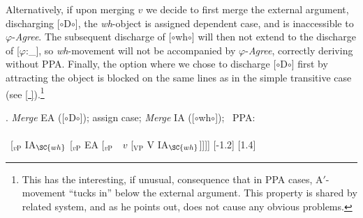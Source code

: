 \documentclass[11pt, letterpaper]{paper_nick}
\newcommand{\fm}[1]{[$\circ$#1$\circ$]}
\begin{document}
Alternatively, if upon merging $v$ we decide to first merge the external argument, discharging \fm{D}, the \emph{wh}-object is assigned dependent case, and is inaccessible to $\varphi$-\emph{Agree}. The subsequent discharge of \fm{wh} will then not extend to the discharge of [$\varphi$:\_], so \emph{wh}-movement will not be accompanied by $\varphi$-\emph{Agree}, correctly deriving \Last[b] without PPA. Finally, the option where we chose to discharge \fm{D} first by attracting the object is blocked on the same lines as in the simple transitive case (see \ref{ }).\footnote{This has the interesting, if unusual, consequence that in PPA cases, A$'$-movement ``tucks in'' below the external argument. This property is shared by  related system, and as he points out, does not cause any obvious problems.} 

\ex. \emph{Merge} EA (\fm{D}); assign case; \emph{Merge} IA (\fm{wh}); \xmark\ PPA:\\\\
\ [$_\text{$v$P}$ \hspace*{-.3cm}IA$_\SC{wh}$ [$_\text{$v$P}$ \hspace*{-.3cm}EA [$_\text{$v$P}$\ \ \hspace*{-.2cm}\hspace*{-.2cm}$v$ [$_\text{VP}$ V \hspace*{-.3cm}IA$_\SC{wh}$]]]]
[-1.2]
[1.4]\\
 
\end{document}
